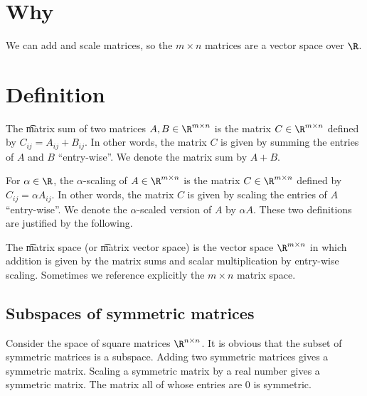 
\section*{Why}

We can add and scale matrices, so the $m \times  n$ matrices are a vector space over $\R $.

\section*{Definition}

The \t{matrix sum} of two matrices $A, B \in \R ^{m \times n}$ is the matrix $C \in \R ^{m \times  n}$ defined by $C_{ij} = A_{ij} + B_{ij}$.
In other words, the matrix $C$ is given by summing the entries of $A$ and $B$ ``entry-wise''.
We denote the matrix sum by $A + B$.

For $\alpha  \in \R $, the \t{$\alpha $-scaling} of $A \in \R ^{m \times  n}$ is the matrix $C \in \R ^{m \times  n}$ defined by $C_{ij} = \alpha  A_{ij}$.
In other words, the matrix $C$ is given by scaling the entries of $A$ ``entry-wise''.
We denote the $\alpha $-scaled version of $A$ by $\alpha  A$.
These two definitions are justified by the following.

The \t{matrix space} (or \t{matrix vector space}) is the vector space $\R ^{m \times  n}$ in which addition is given by the matrix sums and scalar multiplication by entry-wise scaling.
Sometimes we reference explicitly the \t{$m\times n$ matrix space}.

\subsection*{Subspaces of symmetric matrices}

Consider the space of square matrices $\R ^{n \times  n}$.
It is obvious that the subset of symmetric matrices is a subspace.
Adding two symmetric matrices gives a symmetric matrix.
Scaling a symmetric matrix by a real number gives a symmetric matrix.
The matrix all of whose entries are 0 is symmetric.

\blankpage